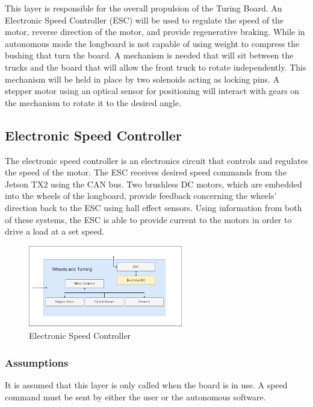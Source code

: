 This layer is responsible for the overall propulsion of the Turing Board. An Electronic Speed Controller (ESC) will be used to regulate the speed of the motor, reverse direction of the motor, and provide regenerative braking. While in autonomous mode the longboard is not capable of using weight to compress the bushing that turn the board. A mechanism is needed that will sit between the trucks and the board that will allow the front truck to rotate independently. This mechanism will be held in place by two solenoids acting as locking pins. A stepper motor using an optical sensor for positioning will interact with gears on the mechanism to rotate it to the desired angle.






\subsection{Electronic Speed Controller}
The electronic speed controller is an electronics circuit that controls and regulates the speed of the motor. The ESC receives desired speed commands from the Jetson TX2 using the CAN bus. Two brushless DC motors, which are embedded into the wheels of the longboard, provide feedback concerning the wheels' direction back to the ESC using hall effect sensors. Using information from both of these systems, the ESC is able to provide current to the motors in order to drive a load at a set speed.


\begin{figure}[h!]
	\centering
 	\includegraphics[width=0.60\textwidth]{ADS Latex/images/Keaton/ESC.png}
 \caption{Electronic Speed Controller}
\end{figure}

\subsubsection{Assumptions}
It is assumed that this layer is only called when the board is in use. A speed command must be sent by either the user or the autonomous software.

